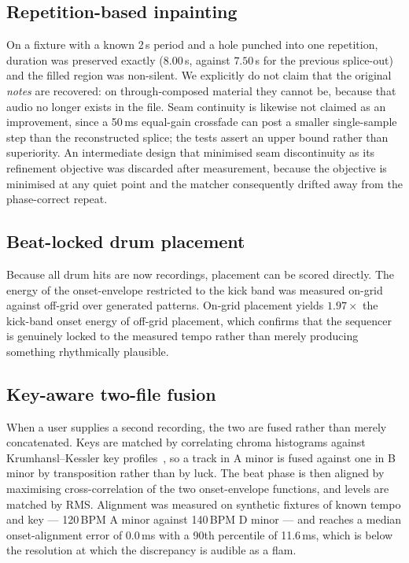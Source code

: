 \documentclass[conference]{IEEEtran}
\begin{document}
\subsection{Repetition-based inpainting}

On a fixture with a known 2\,s period and a hole punched into one repetition,
duration was preserved exactly ($8.00$\,s, against $7.50$\,s for the previous
splice-out) and the filled region was non-silent. We explicitly do not claim
that the original \emph{notes} are recovered: on through-composed material they
cannot be, because that audio no longer exists in the file. Seam continuity is
likewise not claimed as an improvement, since a 50\,ms equal-gain crossfade can
post a smaller single-sample step than the reconstructed splice; the tests
assert an upper bound rather than superiority. An intermediate design that
minimised seam discontinuity as its refinement objective was discarded after
measurement, because the objective is minimised at any quiet point and the
matcher consequently drifted away from the phase-correct repeat.

\subsection{Beat-locked drum placement}

Because all drum hits are now recordings, placement can be scored directly. The
energy of the onset-envelope restricted to the kick band was measured on-grid
against off-grid over generated patterns. On-grid placement yields $1.97\times$
the kick-band onset energy of off-grid placement, which confirms that the
sequencer is genuinely locked to the measured tempo rather than merely producing
something rhythmically plausible.

\subsection{Key-aware two-file fusion}

When a user supplies a second recording, the two are fused rather than merely
concatenated. Keys are matched by correlating chroma histograms against
Krumhansl--Kessler key profiles~\cite{krumhansl1982perceived}, so a track in A
minor is fused against one in B minor by transposition rather than by luck. The
beat phase is then aligned by maximising cross-correlation of the two
onset-envelope functions, and levels are matched by RMS. Alignment was measured
on synthetic fixtures of known tempo and key --- 120\,BPM A minor against
140\,BPM D minor --- and reaches a median onset-alignment error of 0.0\,ms with
a 90th percentile of 11.6\,ms, which is below the resolution at which the
discrepancy is audible as a flam.
\end{document}

